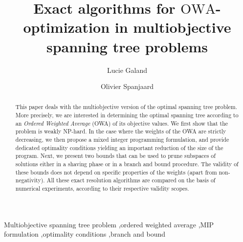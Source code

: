 \documentclass[final,3p,times]{elsarticle}
\newcommand{\owa}{\mbox{OWA}}
\begin{document}
\begin{frontmatter}







\title{Exact algorithms for $\owa$-optimization in multiobjective\\ spanning tree problems}
\author[LIP6]{Lucie Galand}
\author[LIP6]{Olivier Spanjaard}
\address[LIP6]{LIP6-CNRS, Universit\'e Pierre et Marie Curie (UPMC), 104 Avenue du Pr\'esident Kennedy, F-75016 Paris, France}


\begin{abstract}
This paper deals with the multiobjective version of the optimal
spanning tree problem. More precisely, we are interested in determining the optimal
spanning tree according to an \emph{Ordered Weighted Average} (OWA) of its objective values. We first show that the problem is
weakly NP-hard. In the case where the weights of the OWA are strictly decreasing, we then propose a mixed integer programming formulation, and provide dedicated optimality conditions yielding an important reduction of the size of the program. Next, we present two bounds that can be used to prune
subspaces of solutions either in a shaving phase or in a branch and bound procedure. The validity of these bounds does not depend on specific properties of the weights (apart from non-negativity). All these exact resolution algorithms are compared on the basis of numerical experiments, according to their respective validity scopes. 
\end{abstract}

\begin{keyword}
Multiobjective spanning tree problem \sep ordered weighted
  average \sep MIP formulation \sep optimality conditions \sep branch and bound 


\end{keyword}

\end{frontmatter}
\end{document}
